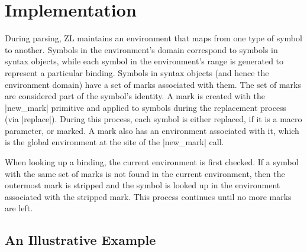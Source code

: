\section{Implementation}
\label{hygiene}
During parsing, ZL maintains an environment that maps from one type of
symbol to another.  Symbols in the environment's domain correspond to
symbols in syntax objects, while each symbol in the environment's
range is generated to represent a particular binding.  Symbols in
syntax objects (and hence the environment domain) have a set of marks
associated with them.  The set of marks are considered part of the
symbol's identity.  A mark is created with the |new_mark| primitive
and applied to symbols during the replacement process (via |replace|).
During this process, each symbol is either replaced, if it is a macro
parameter, or marked.  A mark also has an environment associated with
it, which is the global environment at the site of the |new_mark|
call.

When looking up a binding, the current environment is first checked.  If
a symbol with the same set of marks is not found in the current
environment, then the outermost mark is stripped and the symbol is
looked up in the environment associated with the stripped mark.  This
process continues until no more marks are left.


\subsection{An Illustrative Example}


